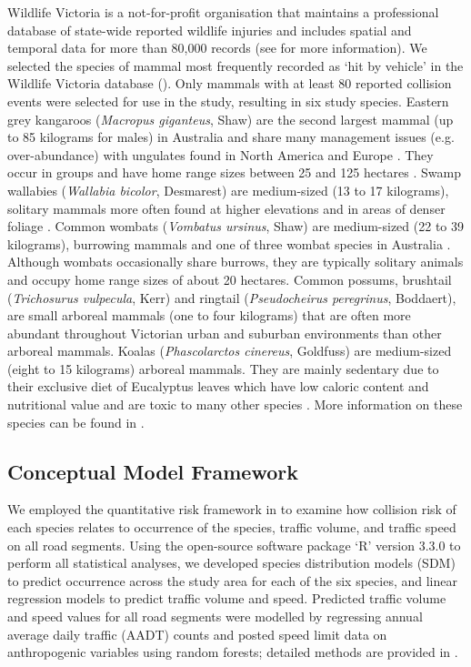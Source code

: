 Wildlife Victoria is a not-for-profit organisation that maintains a professional database of state-wide reported wildlife injuries and includes spatial and temporal data for more than 80,000 records (see  for more information). We selected the species of mammal most frequently recorded as `hit by vehicle' in the Wildlife Victoria database (). Only mammals with at least 80 reported collision events were selected for use in the study, resulting in six study species.  Eastern grey kangaroos (\textit{Macropus giganteus}, Shaw) are the second largest mammal (up to 85 kilograms for males) in Australia and share many management issues (e.g. over-abundance) with ungulates found in North America and Europe \citep{crof04,coul10}. They occur in groups and have home range sizes between 25 and 125 hectares \citep{daws12}.  Swamp wallabies (\textit{Wallabia bicolor}, Desmarest) are medium-sized (13 to 17 kilograms), solitary mammals more often found at higher elevations and in areas of denser foliage \citep{vand08}. Common wombats (\textit{Vombatus ursinus}, Shaw) are medium-sized (22 to 39 kilograms), burrowing mammals and one of three wombat species in Australia \citep{vand08}. Although wombats occasionally share burrows, they are typically solitary animals and occupy home range sizes of about 20 hectares. Common possums, brushtail (\textit{Trichosurus vulpecula}, Kerr) and ringtail (\textit{Pseudocheirus peregrinus}, Boddaert), are small arboreal mammals (one to four kilograms) that are often more abundant throughout Victorian urban and suburban environments than other arboreal mammals.  Koalas (\textit{Phascolarctos cinereus}, Goldfuss) are medium-sized (eight to 15 kilograms) arboreal mammals.  They are mainly sedentary due to their exclusive diet of Eucalyptus leaves which have low caloric content and nutritional value and are toxic to many other species \citep{vand08}. More information on these species can be found in .

\subsection{Conceptual Model Framework}

We employed the quantitative risk framework in  to examine how collision risk of each species relates to occurrence of the species, traffic volume, and traffic speed on all road segments. Using the open-source software package `R' version 3.3.0 \citep{rdct16} to perform all statistical analyses, we developed species distribution models (SDM) to predict occurrence across the study area for each of the six species, and linear regression models to predict traffic volume and speed. Predicted traffic volume and speed values for all road segments were modelled by regressing annual average daily traffic (AADT) counts and posted speed limit data on anthropogenic variables using random forests; detailed methods are provided in . 

